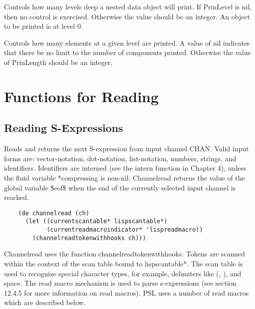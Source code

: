 {   Controls how many levels deep a nested data object will print. 
  If PrinLevel is nil, then no control is exercised.  Otherwise the
  value should be an integer. An object to be printed is at   
 level 0.  
}

{
  Controls how many elements at a given level are printed.   A
  value  of nil indicates that there be no limit to the number
  of components printed.  Otherwise the  value  of  PrinLength
  should be an integer.
}

\section{Functions for Reading}

\subsection{Reading S-Expressions}

{
    Reads  and  returns the next S-expression from input channel
    CHAN.  Valid input forms are: vector-notation, dot-notation,
    list-notation,   numbers,    strings,    and    identifiers.
    Identifiers are interned (see the intern function in Chapter
    4),  unless  the  fluid  variable  *compressing  is non-nil.
    Channelread returns the value of the global  variable \$eof\$
    when  the  end  of  the  currently selected input channel is
    reached.
}
\begin{verbatim}
    (de channelread (ch)
      (let ((currentscantable* lispscantable*)
            (currentreadmacroindicator* 'lispreadmacro))
        (channelreadtokenwithhooks ch)))
\end{verbatim}
    Channelread  uses  the  function  channelreadtokenwithhooks.
    Tokens  are  scanned  within  the  context of the scan table
    bound  to  lispscantable*.   The  scan  table  is  used   to
    recognize  special  character types, for example, delimiters
    like (, ), and space.  The read macro mechanism is  used  to
    parse s-expressions (see section 12.4.5 for more information
    on read macros).  PSL uses a number of read macros which are
    described below.\\

